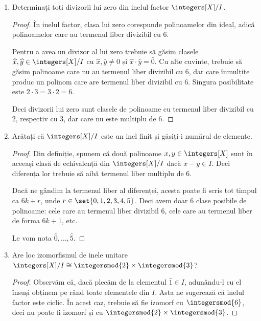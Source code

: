 \begin{enumerate}
\begin{proof}
    \(I\) nu este ideal principal. Să presupunem, prin reducere la absurd, că ar fi ideal principal. Atunci el s-ar putea genera de la un singur element, pe care îl notăm \(a \in \integers[X]\). Să presupunem că vrem să generăm polinomul de grad zero \(5\). Trebuie să existe un \(f \in \integers[X]\) astfel încât \(f \cdot a = 5\). Deoarece rezultatul are grad zero, trebuie ca \(f\) să aibă tot grad (cel mult) zero, adică \(f \in \integers\). Dar știm că \(a\) are termenul liber divizibil cu 6, și indiferent cu ce am înmulți din \(\integers\), nu putem face termenul liber să fie egal cu 5.
    \end{proof}

    \item Determinați toți divizorii lui zero din inelul factor \(\integers[X]/I\).
    \begin{proof}
    În inelul factor, clasa lui zero corespunde polinoamelor din ideal, adică polinoamelor care au termenul liber divizibil cu 6.

    Pentru a avea un divizor al lui zero trebuie să găsim clasele \(\widehat{x}, \widehat{y} \in \integers[X]/I\) cu \(\widehat{x}, \widehat{y} \neq 0\) și \(\widehat{x} \cdot \widehat{y} = \widehat{0}\). Cu alte cuvinte, trebuie să găsim polinoame care nu au termenul liber divizibil cu 6, dar care înmulțite produc un polinom care are termenul liber divizibil cu 6. Singura posibilitate este \(2 \cdot 3 = 3 \cdot 2 = 6\).

    Deci divizorii lui zero sunt clasele de polinoame cu termenul liber divizibil cu 2, respectiv cu 3, dar care nu este multiplu de 6.
    \end{proof}

    \item Arătați că \(\integers[X]/I\) este un inel finit și găsiți-i numărul de elemente.
    \begin{proof}
    Din definiție, spunem că două polinoame \(x, y \in \integers[X]\) sunt în aceeași clasă de echivalență din \(\integers[X]/I\) dacă \(x - y \in I\). Deci diferența lor trebuie să aibă termenul liber multiplu de 6.

    Dacă ne gândim la termenul liber al diferenței, acesta poate fi scris tot timpul ca \(6k + r\), unde \(r \in \set{ 0, 1, 2, 3, 4, 5 }\). Deci avem doar 6 clase posibile de polinoame: cele care au termenul liber divizibil 6, cele care au termenul liber de forma \(6k + 1\), etc.

    Le vom nota \(\widehat{0}, \dots, \widehat{5}\).
    \end{proof}

    \item Are loc izomorfismul de inele unitare \(\integers[X]/I \cong \integersmod{2}\times\integersmod{3}\)?
    \begin{proof}
    Observăm că, dacă plecăm de la elementul \(\widehat{1} \in I\), adunându-l cu el însuși obținem pe rând toate elementele din \(I\). Asta ne sugerează că inelul factor este ciclic. În acest caz, trebuie să fie izomorf cu \(\integersmod{6}\), deci nu poate fi izomorf și cu \(\integersmod{2}\times\integersmod{3}\).
    \end{proof}
\end{enumerate}

